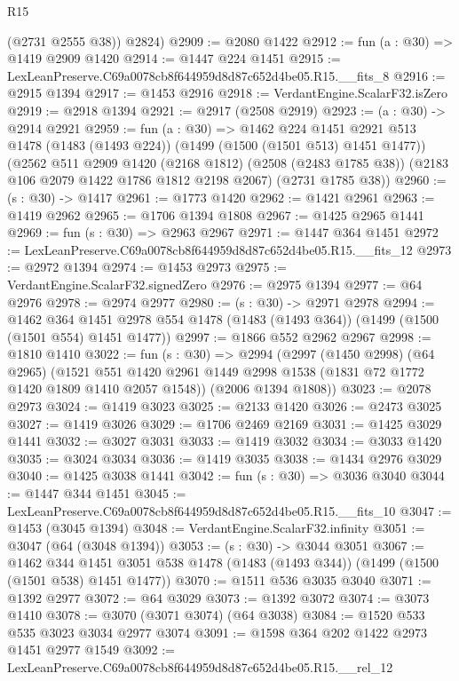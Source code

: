 \begin{lexlean}{R15}
\begin{coremodule}
        (@2731 @2555 @38))
      @2824)
@2909 := @2080 @1422
@2912 := fun (a : @30) => @1419 @2909 @1420
@2914 := @1447 @224 @1451
@2915 := LexLeanPreserve.C69a0078cb8f644959d8d87c652d4be05.R15.__fits_8
@2916 := @2915 @1394
@2917 := @1453 @2916
@2918 := VerdantEngine.ScalarF32.isZero
@2919 := @2918 @1394
@2921 := @2917 (@2508 @2919)
@2923 := (a : @30) -> @2914 @2921
@2959 := fun (a : @30) =>
  @1462
    @224
    @1451
    @2921
    @513
    @1478
    (@1483 (@1493 @224))
    (@1499 (@1500 (@1501 @513) @1451 @1477))
    (@2562
      @511
      @2909
      @1420
      (@2168 @1812)
      (@2508 (@2483 @1785 @38))
      (@2183 @106 @2079 @1422 @1786 @1812 @2198 @2067)
      (@2731 @1785 @38))
@2960 := (s : @30) -> @1417
@2961 := @1773 @1420
@2962 := @1421 @2961
@2963 := @1419 @2962
@2965 := @1706 @1394 @1808
@2967 := @1425 @2965 @1441
@2969 := fun (s : @30) => @2963 @2967
@2971 := @1447 @364 @1451
@2972 := LexLeanPreserve.C69a0078cb8f644959d8d87c652d4be05.R15.__fits_12
@2973 := @2972 @1394
@2974 := @1453 @2973
@2975 := VerdantEngine.ScalarF32.signedZero
@2976 := @2975 @1394
@2977 := @64 @2976
@2978 := @2974 @2977
@2980 := (s : @30) -> @2971 @2978
@2994 := @1462
    @364
    @1451
    @2978
    @554
    @1478
    (@1483 (@1493 @364))
    (@1499 (@1500 (@1501 @554) @1451 @1477))
@2997 := @1866 @552 @2962 @2967
@2998 := @1810 @1410
@3022 := fun (s : @30) =>
  @2994
    (@2997
      (@1450 @2998)
      (@64 @2965)
      (@1521 @551 @1420 @2961 @1449 @2998 @1538 (@1831 @72 @1772 @1420 @1809 @1410 @2057 @1548))
      (@2006 @1394 @1808))
@3023 := @2078 @2973
@3024 := @1419 @3023
@3025 := @2133 @1420
@3026 := @2473 @3025
@3027 := @1419 @3026
@3029 := @1706 @2469 @2169
@3031 := @1425 @3029 @1441
@3032 := @3027 @3031
@3033 := @1419 @3032
@3034 := @3033 @1420
@3035 := @3024 @3034
@3036 := @1419 @3035
@3038 := @1434 @2976 @3029
@3040 := @1425 @3038 @1441
@3042 := fun (s : @30) => @3036 @3040
@3044 := @1447 @344 @1451
@3045 := LexLeanPreserve.C69a0078cb8f644959d8d87c652d4be05.R15.__fits_10
@3047 := @1453 (@3045 @1394)
@3048 := VerdantEngine.ScalarF32.infinity
@3051 := @3047 (@64 (@3048 @1394))
@3053 := (s : @30) -> @3044 @3051
@3067 := @1462
    @344
    @1451
    @3051
    @538
    @1478
    (@1483 (@1493 @344))
    (@1499 (@1500 (@1501 @538) @1451 @1477))
@3070 := @1511 @536 @3035 @3040
@3071 := @1392 @2977
@3072 := @64 @3029
@3073 := @1392 @3072
@3074 := @3073 @1410
@3078 := @3070 (@3071 @3074) (@64 @3038)
@3084 := @1520 @533 @535 @3023 @3034 @2977 @3074
@3091 := @1598 @364 @202 @1422 @2973 @1451 @2977 @1549
@3092 := LexLeanPreserve.C69a0078cb8f644959d8d87c652d4be05.R15.__rel_12

\end{coremodule}
\end{lexlean}
